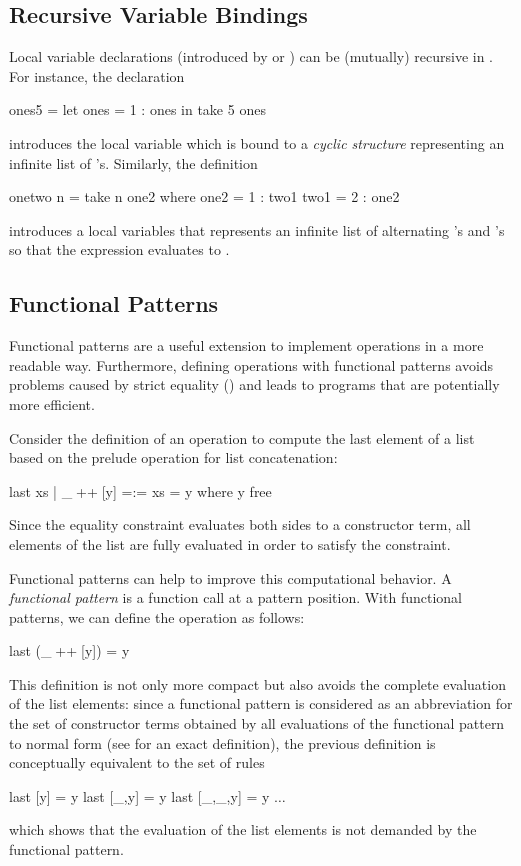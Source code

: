 \subsection{Recursive Variable Bindings}

Local variable declarations (introduced by 
or ) can be (mutually) recursive in \CYS.
For instance, the declaration
\begin{curry}
ones5 = let ones = 1 : ones
         in take 5 ones
\end{curry}
introduces the local variable  which is bound
to a \emph{cyclic structure}
representing an infinite list of 's.
Similarly, the definition
\begin{curry}
onetwo n = take n one2
 where
   one2 = 1 : two1
   two1 = 2 : one2
\end{curry}
introduces a local variables  that represents
an infinite list of alternating 's and 's
so that the expression  evaluates to \code{[1,2,1,2,1,2]}.


\subsection{Functional Patterns}

Functional patterns \cite{AntoyHanus05LOPSTR} are a useful extension
to implement operations in a more readable way. Furthermore,
defining operations with functional patterns avoids problems
caused by strict equality (\ccode{=:=}) and leads to programs
that are potentially more efficient.

Consider the definition of an operation to compute the last element
of a list  based on the prelude operation \ccode{++}
for list concatenation:
\begin{curry}
last xs | _$\;$++$\;$[y] =:= xs  = y   where y free
\end{curry}
Since the equality constraint \ccode{=:=} evaluates both sides
to a constructor term, all elements of the list  are
fully evaluated in order to satisfy the constraint.

Functional patterns can help to improve this computational behavior.
A \emph{functional pattern}
is a function call at a pattern position. With functional patterns,
we can define the operation  as follows:
\begin{curry}
last (_$\;$++$\;$[y]) = y
\end{curry}
This definition is not only more compact but also avoids the complete
evaluation of the list elements: since a functional pattern is considered
as an abbreviation for the set of constructor terms obtained by all
evaluations of the functional pattern to normal form (see
\cite{AntoyHanus05LOPSTR} for an exact definition), the previous
definition is conceptually equivalent to the set of rules
\begin{curry}
last [y] = y
last [_,y] = y
last [_,_,y] = y
$\ldots$
\end{curry}
which shows that the evaluation of the list elements is not demanded
by the functional pattern.

